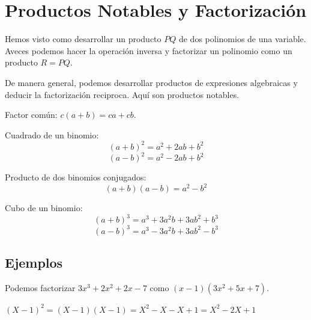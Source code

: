 \section{Productos Notables y Factorización}

Hemos visto como desarrollar un producto $PQ$ de dos polinomios
de una variable. Aveces podemos
hacer la operación inversa y factorizar un polinomio como un producto $R=PQ$.

De manera general, podemos desarrollar productos de expresiones algebraicas
y deducir la factorización reciproca. Aquí son productos notables.

Factor común: $c(a + b) = ca + cb$.

\begin{center}
\end{center}

Cuadrado de un binomio:
$${(a+b)}^2 = a^2 + 2ab + b^2$$
$${(a-b)}^2 = a^2 - 2ab + b^2$$

\begin{center}
\end{center}

Producto de dos binomios conjugados:
$$(a + b)(a - b) = a^2 - b^2$$

Cubo de un binomio:
$${(a+b)}^3  = a^3 + 3a^2b + 3ab^2 + b^3$$
$${(a-b)}^3  = a^3 - 3a^2b + 3ab^2 - b^3$$

\subsection*{Ejemplos}

Podemos factorizar $3x^3 + 2x^2 + 2x - 7$ como $(x-1)(3x^2+5x+7)$.

$(X-1)^2 = (X-1)(X-1) = X^2 - X - X + 1 = X^2-2X+1$

